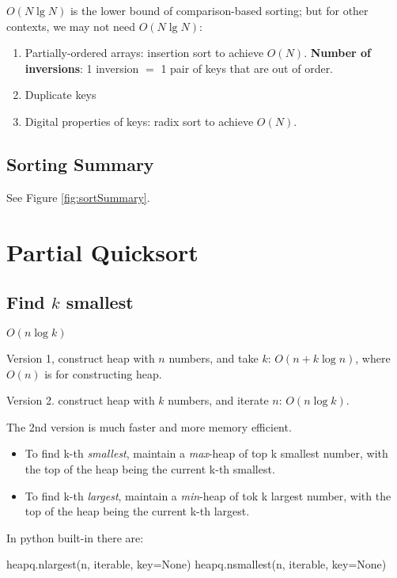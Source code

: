 $O(N\lg N)$ is the lower bound of comparison-based sorting; but for other
contexts, we may not need $O(N \lg N)$:
\begin{enumerate}
\item Partially-ordered arrays: insertion sort to achieve $O(N)$. \textbf{Number of inversions}: 1 inversion $=$ 1 pair of keys that are out
of order.
\item Duplicate keys
\item Digital properties of keys: radix sort to achieve $O(N)$.
\end{enumerate}

\subsection{Sorting Summary}
See Figure \ref{fig:sortSummary}.
\begin{figure*}[h]
\centering
{}
\caption{Sort summary}
\label{fig:sortSummary} 
\end{figure*}

\section{Partial Quicksort}
\subsection{Find $k$ smallest}\label{find-k-th}
 $O(n \log k)$

Version 1, construct heap with $n$ numbers, and take $k$: $O(n+k\log n)$, where $O(n)$ is for constructing heap. 

Version 2. construct heap with $k$ numbers, and iterate $n$: $O(n\log k)$. 

The 2nd version is much faster and more memory efficient. 

\begin{itemize}
\item To find k-th \textit{smallest}, maintain a \textit{max}-heap of top k smallest number, with the top of the heap being the current k-th smallest. 
\item To find k-th \textit{largest}, maintain a \textit{min}-heap of tok k largest number, with the top of the heap being the current k-th largest.
\end{itemize}



In python built-in there are:
\begin{python}
heapq.nlargest(n, iterable, key=None)
heapq.nsmallest(n, iterable, key=None)
\end{python}


